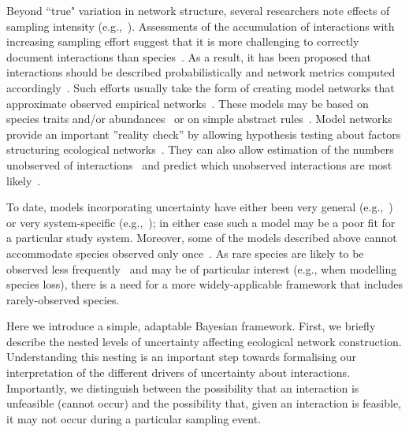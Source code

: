 \documentclass[12pt]{article}
\begin{document}
\begin{spacing}{2.0}
    Beyond ``true" variation in network structure, several researchers note effects of sampling intensity (e.g.,~\citealp{Martinez1999,Bluthgen2006,Jordano2016}). Assessments of the accumulation of interactions with increasing sampling effort suggest that it is more challenging to correctly document interactions than species~\citep{Guimera2009,Poisot2012,Bartomeus2013,Jordano2016,Giron2018,Graham2018}. As a result, it has been proposed that interactions should be described probabilistically and network metrics computed accordingly~\citep{Bartomeus2013,Poisot2016}. Such efforts usually take the form of creating model networks that approximate observed empirical networks~\citep{Allesina2008,Guimera2009,Williams2010,Rohr2016}. These models may be based on species traits and/or abundances~\citep{Rohr2016,Weinstein2017,Weinstein2017a,Graham2018} or on simple abstract rules~\citep{Allesina2008,Guimera2009,Williams2010}. Model networks provide an important ''reality check'' by allowing hypothesis testing about factors structuring ecological networks~\citep{Bartomeus2013,Weinstein2017,Weinstein2017a,Graham2018}. They can also allow estimation of the numbers unobserved of interactions~\citep{Jordano2016,Weinstein2017a} and predict which unobserved interactions are most likely~\citep{Guimera2009,Bartomeus2013}. 


    To date, models incorporating uncertainty have either been very general (e.g.,~\citet{Guimera2009,Gravel2018}) or very system-specific (e.g.,~\citet{Bartomeus2013,Weinstein2017,Weinstein2017a,Graham2018}); in either case such a model may be a poor fit for a particular study system. Moreover, some of the models described above cannot accommodate species observed only once~\citep{Bartomeus2013,Weinstein2017}. As rare species are likely to be observed less frequently~\citep{Bluthgen2006} and may be of particular interest (e.g., when modelling species loss), there is a need for a more widely-applicable framework that includes rarely-observed species. 


    Here we introduce a simple, adaptable Bayesian framework. First, we briefly describe the nested levels of uncertainty affecting ecological network construction. Understanding this nesting is an important step towards formalising our interpretation of the different drivers of uncertainty about interactions. Importantly, we distinguish between the possibility that an interaction is unfeasible (cannot occur) and the possibility that, given an interaction is feasible, it may not occur during a particular sampling event. 



\end{spacing}
\end{document}
